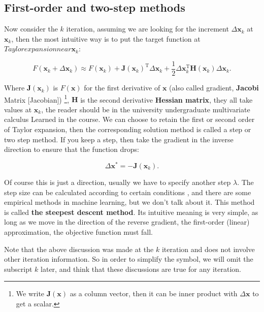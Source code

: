 \subsection{First-order and two-step methods}

Now consider the $k$ iteration, assuming we are looking for the increment $\Delta \bm{x}_k$ at $\bm{x}_k$, then the most intuitive way is to put the target function at $ Taylor expansion near \bm{x}_k$:

\begin{equation}
F(\bm{x}_k+\Delta \bm{x}_k) \approx F{\left( \bm{x}_k \right)} + \bm{J} \left( \bm{x}_k \right) ^\mathrm{T} \Delta \bm{x}_k + \frac{1}{2}\Delta {\bm{x}_k^\mathrm{T}}\bm{H}(\bm{x}_k) \Delta \bm{x}_k.
\end{equation}

Where $\bm{J}(\bm{x}_k)$ is $F(\bm{x})$ for the first derivative of $\bm{x}$ (also called gradient, \textbf{Jacobi} Matrix [Jacobian]) \footnote{We write $\bm{J}(\bm{x})$ as a column vector, then it can be inner product with $\Delta \bm{x}$ to get a scalar. }, 
$\bm{H}$ is the second derivative \textbf{Hessian matrix}, they all take values at $\bm{x}_k$, the reader should be in the university undergraduate multivariate calculus Learned in the course. We can choose to retain the first or second order of Taylor expansion, then the corresponding solution method is called a step or two step method.
If you keep a step, then take the gradient in the inverse direction to ensure that the function drops:
	
\begin{equation}
\Delta \bm{x}^* = - \bm{J}(\bm{x}_k).
\end{equation}

Of course this is just a direction, usually we have to specify another step $\lambda$. The step size can be calculated according to certain conditions \textsuperscript{\cite{Wolfe1969}}, and there are some empirical methods in machine learning, but we don't talk about it. This method is called \textbf{the steepest descent method}. Its intuitive meaning is very simple, as long as we move in the direction of the reverse gradient, the first-order (linear) approximation, the objective function must fall.

Note that the above discussion was made at the $k$ iteration and does not involve other iteration information. So in order to simplify the symbol, we will omit the subscript $k$ later, and think that these discussions are true for any iteration.

